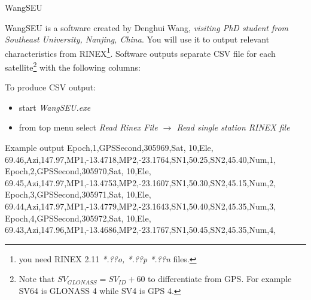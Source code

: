 \documentclass[11pt]{beamer}
\begin{document}
	\begin{frame}[allowframebreaks]{WangSEU}

	WangSEU is a software created by Denghui Wang, \textit{visiting PhD student from Southeast University, Nanjing, China}. You will use it to output relevant characteristics from RINEX\footnote{you need RINEX 2.11 \textit{*.??o, *.??p *.??n} files.}. Software outputs separate CSV file for each satellite\footnote{Note that $SV_{GLONASS} =  SV_{ID} + 60$ to differentiate from GPS. For example SV64 is GLONASS 4 while SV4 is GPS 4.} with the following columns:\\


To produce CSV output:
 
\begin{itemize}
	\item start \textit{WangSEU.exe}
	\item from top menu select \textit{Read Rinex File $\rightarrow$ Read single station RINEX file}
\end{itemize}

	\begin{exampleblock}{Example output}{
{\tiny
Epoch,1,GPSSecond,305969,Sat, 10,Ele, 69.46,Azi,147.97,MP1,-13.4718,MP2,-23.1764,SN1,50.25,SN2,45.40,Num,1,\\
Epoch,2,GPSSecond,305970,Sat, 10,Ele, 69.45,Azi,147.97,MP1,-13.4753,MP2,-23.1607,SN1,50.30,SN2,45.15,Num,2,\\
Epoch,3,GPSSecond,305971,Sat, 10,Ele, 69.44,Azi,147.97,MP1,-13.4779,MP2,-23.1643,SN1,50.40,SN2,45.35,Num,3,\\
Epoch,4,GPSSecond,305972,Sat, 10,Ele, 69.43,Azi,147.96,MP1,-13.4686,MP2,-23.1767,SN1,50.45,SN2,45.35,Num,4,\\
} %
		} %
	\end{exampleblock}
	\end{frame}
\end{document}
